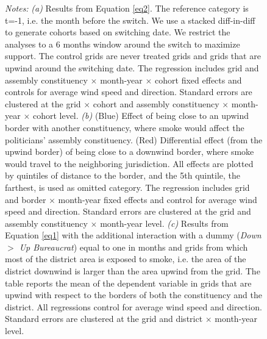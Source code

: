 \documentclass[12pt]{article}
\begin{document}
\begin{figure}
    \vspace{-0.3cm}
    \begin{minipage}{\textwidth}
        {\small \textit{Notes: } \textit{(a)} Results from Equation \ref{eq2}.
         The reference category is t=-1, i.e. the month before the switch. We use a stacked diff-in-diff to generate cohorts based on switching date. We restrict the analyses to a 6 months window around the switch to maximize support. The control grids are never treated grids and grids that are upwind around the switching date. 
          The regression includes grid and assembly constituency $\times$ month-year $\times$ cohort fixed effects and controls for average wind speed and direction. Standard errors are clustered at the grid $\times$ cohort and assembly constituency $\times$ month-year $\times$ cohort level.
          \textit{(b)} (Blue) Effect of being close to an upwind border with another constituency, where smoke would affect the politicians' assembly constituency. (Red) Differential effect (from the upwind border) of being close to a downwind border, where smoke would travel to the neighboring jurisdiction.  All effects are plotted by quintiles of distance to the border, and the 5th quintile, the farthest, is used as omitted category. The regression includes  grid and border $\times$ month-year fixed effects and control for average wind speed and direction. Standard errors are clustered at the grid and assembly constituency $\times$ month-year level.
          \textit{(c)} Results from Equation \ref{eq1} with the additional interaction with a dummy (\textit{Down $>$ Up Bureaucrat}) equal to one in months and grids from which most of the district area is exposed to smoke, i.e. the area of the district downwind is larger than the area upwind from the grid.
      The table reports the mean of the dependent variable in grids that are upwind with respect to the borders of both the constituency and the district.   All regressions control for average wind speed and direction. Standard errors are clustered at the grid and district $\times$ month-year level. }   %
    \end{minipage}
\end{figure}

 
\end{document}
